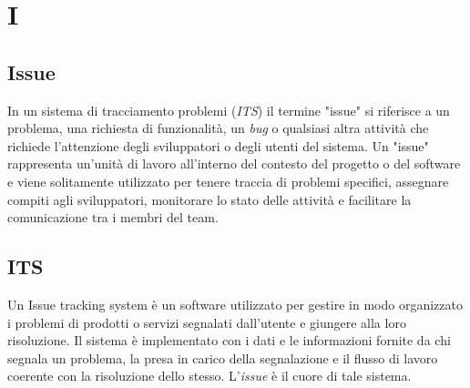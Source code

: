 \chapter{I}

\section{Issue}
In un sistema di tracciamento problemi (\emph{ITS}) il termine "issue" si riferisce a un problema, una richiesta di funzionalità, un \emph{bug} o qualsiasi altra attività che richiede l'attenzione degli sviluppatori o degli utenti del sistema. Un "issue" rappresenta un'unità di lavoro all'interno del contesto del progetto o del software e viene solitamente utilizzato per tenere traccia di problemi specifici, assegnare compiti agli sviluppatori, monitorare lo stato delle attività e facilitare la comunicazione tra i membri del team.

\section{ITS}
Un Issue tracking system è un software utilizzato per gestire in modo organizzato i problemi di prodotti o servizi segnalati dall’utente e giungere alla loro risoluzione. Il sistema è implementato con i dati e le informazioni fornite da chi segnala un problema, la presa in carico della segnalazione e il flusso di lavoro coerente con la risoluzione dello stesso. L'\emph{issue} è il cuore di tale sistema.
